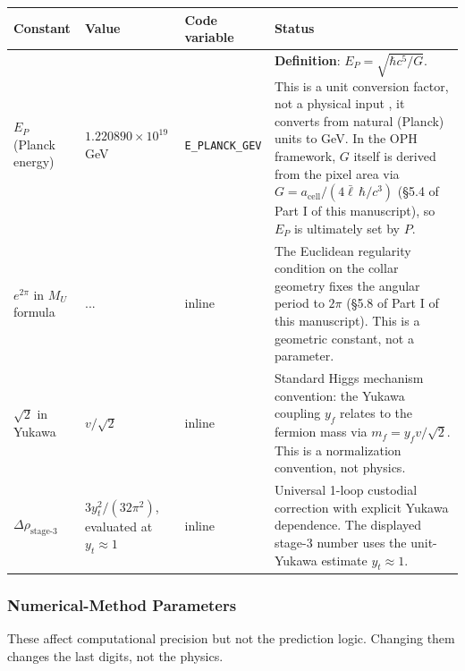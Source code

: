{\def\LTcaptype{none} %
\setlength{\LTleft}{0pt}
\setlength{\LTright}{0pt}
\setlength{\tabcolsep}{1.2pt}
\renewcommand{\arraystretch}{1.05}
\footnotesize
\begin{longtable}[]{@{}>{\RaggedRight\arraybackslash}p{}>{\RaggedRight\arraybackslash}p{}>{\RaggedRight\arraybackslash}p{}>{\RaggedRight\arraybackslash}p{}@{}}
\toprule\noalign{}
Constant & Value & Code variable & Status \\
\midrule\noalign{}
\endhead
\bottomrule\noalign{}
\endlastfoot
\(E_P\) (Planck energy) & \(1.220890 \times 10^{19}\) GeV & \texttt{E\_PLANCK\_GEV} & \textbf{Definition}: \(E_P = \sqrt{\hbar c^5/G}\). This is a unit conversion factor, not a physical input , it converts from natural (Planck) units to GeV. In the OPH framework, \(G\) itself is derived from the pixel area via \(G = a_{\text{cell}}/(4\bar{\ell}\,\hbar/c^3)\) (\S{}5.4 of Part I of this manuscript), so \(E_P\) is ultimately set by \(P\). \\
\(e^{2\pi}\) in \(M_U\) formula & 535.49... & inline & The Euclidean regularity condition on the collar geometry fixes the angular period to \(2\pi\) (\S{}5.8 of Part I of this manuscript). This is a geometric constant, not a parameter. \\
\(\sqrt{2}\) in Yukawa & \(v/\sqrt{2}\) & inline & Standard Higgs mechanism convention: the Yukawa coupling \(y_f\) relates to the fermion mass via \(m_f = y_f v / \sqrt{2}\). This is a normalization convention, not physics. \\
\(\Delta\rho_{\text{stage-3}}\) & \(3y_t^2/(32\pi^2)\), evaluated at \(y_t \approx 1\) & inline & Universal 1-loop custodial correction with explicit Yukawa dependence. The displayed stage-3 number uses the unit-Yukawa estimate \(y_t \approx 1\). \\
\end{longtable}
}

\subsubsection{Numerical-Method Parameters}\label{1a5-numerical-method-parameters}

These affect computational precision but not the prediction logic. Changing them changes the last digits, not the physics.


